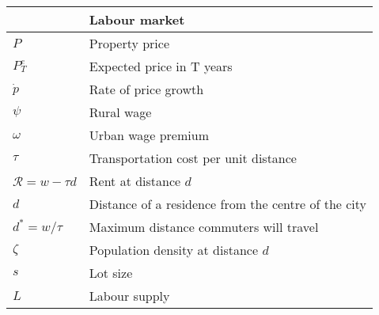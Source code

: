 \begin{longtable}{lp{10cm}}
\hline           &  \textbf{Labour market}  \\ \hline %
$P$              &  Property price          \\
$P^e_T$          & Expected price in T years    \\
$\dot p$         &  Rate of price growth    \\
$\psi$           &  Rural wage              \\
$\omega$         &  Urban wage premium \\
$\tau$           &  Transportation cost per unit distance \\
$\mathcal{R} = w-\tau d$ & Rent at distance $d$  \\ 
$d$              &  Distance of a residence from the centre of the city \\
$d^* = w/\tau$   &  Maximum distance commuters will travel \\ %
$\zeta$          &  Population density at distance $d$ \\
$s$              &  Lot size     \\
$L$              &  Labour supply \\ %


\end{longtable}
